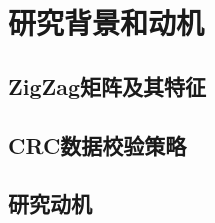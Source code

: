 \section{研究背景和动机}
\label{chap:zigzag:motivation}

\subsection{ZigZag矩阵及其特征}
\label{chap:zigzag:motivation:zigzag}

\subsection{CRC数据校验策略}
\label{chap:zigzag:motivation:crc}

\subsection{研究动机}
\label{chap:zigzag:motivation:conclude}
